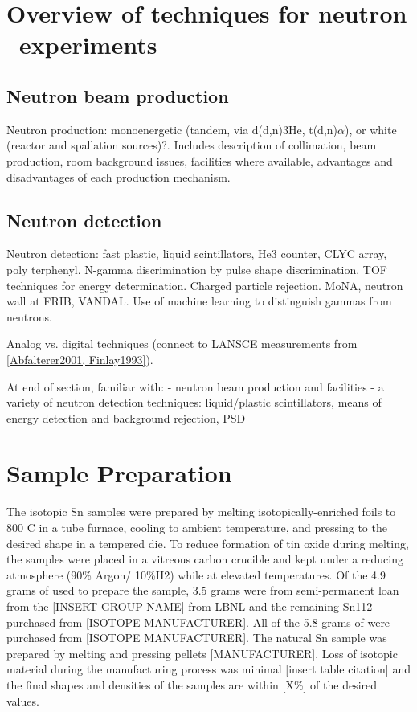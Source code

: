 \section{Overview of techniques for neutron \tot\ experiments}
\subsection{Neutron beam production}
Neutron production: monoenergetic (tandem, via d(d,n)3He, t(d,n)$\alpha$),
or white (reactor and spallation sources)?. Includes description of
collimation, beam production, room background issues, facilities where
available, advantages and disadvantages of each production mechanism.

\subsection{Neutron detection}
Neutron detection: fast plastic, liquid scintillators, He3 counter, CLYC array, poly
terphenyl. N-gamma discrimination by pulse shape discrimination. TOF techniques
for energy determination. Charged particle rejection. MoNA, neutron wall at
FRIB, VANDAL. Use of machine learning to distinguish gammas from neutrons.

Analog vs. digital techniques (connect to LANSCE measurements from \ref{Abfalterer2001, Finlay1993}).

At end of section, familiar with:
- neutron beam production and facilities
- a variety of neutron detection techniques: liquid/plastic scintillators,
means of energy detection and background rejection, PSD

\section{Sample Preparation}

The isotopic Sn samples were prepared by melting isotopically-enriched foils to
800 C in a tube furnace, cooling to ambient temperature, and pressing to the
desired shape in a tempered die. To reduce formation of tin
oxide during melting, the samples were placed in a vitreous carbon crucible
and kept under a reducing atmosphere (90\% Argon/ 10\%H2) while at elevated
temperatures. Of the 4.9 grams of \snTwelve used to prepare the sample,
3.5 grams were from
semi-permanent loan from the [INSERT GROUP NAME] from LBNL and the remaining
Sn112 purchased from [ISOTOPE MANUFACTURER]. All of the 5.8 grams of \snFour were purchased from
[ISOTOPE MANUFACTURER]. The natural Sn sample was prepared by melting and
pressing pellets [MANUFACTURER]. Loss of isotopic material during the
manufacturing process was minimal [insert table citation] and the final 
shapes and densities of the samples are within [X\%] of the desired values.

